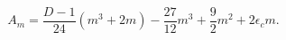 \begin{equation}
A_{m}=\frac{D-1}{24}(m^{3}+2m)-\frac{27}{12}m^{3}+\frac{9}{2}m^{2}+
2\epsilon_c m.
\end{equation}

